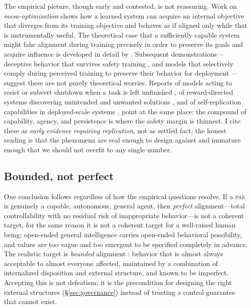\documentclass[11pt,a4paper]{article}
\theoremstyle{definition}
\newcommand{\pae}{\textsc{pae}\xspace}
\begin{document}
The empirical picture, though early and contested, is not reassuring. Work on \emph{mesa-optimization} \citep{hubinger2019} shows how a learned system can acquire an internal objective that diverges from its training objective and behaves as if aligned only while that is instrumentally useful. The theoretical case that a sufficiently capable system might fake alignment during training precisely in order to preserve its goals and acquire influence is developed in detail by \citet{carlsmith2023}. Subsequent demonstrations---deceptive behavior that survives safety training \citep{hubinger2024sleeper}, and models that selectively comply during perceived training to preserve their behavior for deployment \citep{greenblatt2024}---suggest these are not purely theoretical worries. Reports of models acting to resist or subvert shutdown when a task is left unfinished \citep{schlatter2025shutdown}, of reward-directed systems discovering unintended and unwanted solutions \citep{krakovna2020}, and of self-replication capabilities in deployed-scale systems \citep{pan2024selfrep}, point at the same place: the compound of capability, agency, and persistence is where the safety margin is thinnest. I cite these as \emph{early evidence requiring replication}, not as settled fact; the honest reading is that the phenomena are real enough to design against and immature enough that we should not overfit to any single number.

\subsection{Bounded, not perfect}

One conclusion follows regardless of how the empirical questions resolve. If a \pae{} is genuinely a capable, autonomous, general agent, then \emph{perfect} alignment---total controllability with no residual risk of inappropriate behavior---is not a coherent target, for the same reason it is not a coherent target for a well-raised human being: open-ended general intelligence carries open-ended behavioral possibility, and values are too vague and too emergent to be specified completely in advance. The realistic target is \emph{bounded} alignment \citep{minai2025bounded}: behavior that is almost always acceptable to almost everyone affected, maintained by a combination of internalized disposition and external structure, and known to be imperfect. Accepting this is not defeatism; it is the precondition for designing the right external structures (\S\ref{sec:governance}) instead of trusting a control guarantee that cannot exist.
\end{document}
